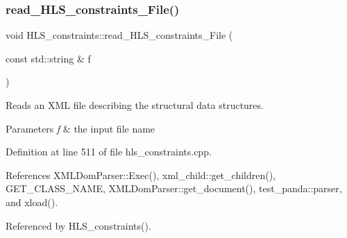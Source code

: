 \subsubsection{\texorpdfstring{read\+\_\+\+H\+L\+S\+\_\+constraints\+\_\+\+File()}{read\_HLS\_constraints\_File()}}
{\footnotesize\ttfamily void H\+L\+S\+\_\+constraints\+::read\+\_\+\+H\+L\+S\+\_\+constraints\+\_\+\+File (\begin{DoxyParamCaption}\item[{const std\+::string \&}]{f }\end{DoxyParamCaption})}



Reads an X\+ML file describing the structural data structures. 


\begin{DoxyParams}{Parameters}
{\em f} & the input file name \\
\hline
\end{DoxyParams}


Definition at line 511 of file hls\+\_\+constraints.\+cpp.



References X\+M\+L\+Dom\+Parser\+::\+Exec(), xml\+\_\+child\+::get\+\_\+children(), G\+E\+T\+\_\+\+C\+L\+A\+S\+S\+\_\+\+N\+A\+ME, X\+M\+L\+Dom\+Parser\+::get\+\_\+document(), test\+\_\+panda\+::parser, and xload().



Referenced by H\+L\+S\+\_\+constraints().

